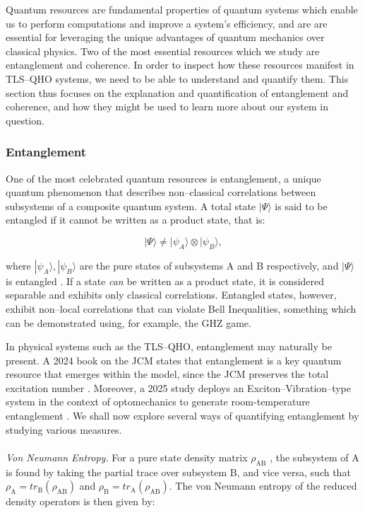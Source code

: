 \documentclass[12pt]{article}
\begin{document}
Quantum resources are fundamental properties of quantum systems which enable us to perform computations and improve a system's efficiency, and are are essential for leveraging the unique advantages of quantum mechanics over classical physics. Two of the most essential resources which we study are entanglement and coherence. In order to inspect how these resources manifest in TLS--QHO systems, we need to be able to understand and quantify them. This section thus focuses on the explanation and quantification of entanglement and coherence, and how they might be used to learn more about our system in question. 

\subsubsection{Entanglement}

One of the most celebrated quantum resources is entanglement, a unique quantum phenomenon that describes non--classical correlations between subsystems of a composite quantum system. A total state $|\Psi\rangle$ is said to be entangled if it cannot be written as a product state, that is:

\begin{equation}
    |\Psi\rangle \neq |\psi_A\rangle \otimes |\psi_B\rangle,
\end{equation}

where $|\psi_A\rangle, |\psi_B\rangle$ are the pure states of subsystems A and B respectively, and $|\Psi\rangle$ is entangled \cite{Entanglement1999-Overview_&REE}. If a state \textit{can} be written as a product state, it is considered separable and exhibits only classical correlations. Entangled states, however, exhibit non--local correlations that can violate Bell Inequalities, something which can be demonstrated using, for example, the GHZ game. 

In physical systems such as the TLS--QHO, entanglement may  naturally be present. A 2024 book on the JCM states that entanglement is a key quantum resource that emerges within the model, since the JCM preserves the total excitation number \cite{General2024-JC_overview}. Moreover, a 2025 study deploys an Exciton--Vibration--type system in the context of optomechanics to generate room-temperature entanglement \cite{Entanglement2025-ExVib_roomtemp}. We shall now explore several ways of quantifying entanglement by studying various measures. \\
\\
\textit{Von Neumann Entropy.} For a pure state density matrix $\rho_{\scriptscriptstyle \text{AB}}$ \cite{Entanglement1999-Overview_&REE}, the subsystem of A is  found by taking the partial trace over subsystem B, and vice versa, such that $\rho_{\scriptscriptstyle \text{A}} = tr_{\scriptscriptstyle \text{B}}(\rho_{\scriptscriptstyle \text{AB}})$ and $\rho_{\scriptscriptstyle \text{B}} = tr_{\scriptscriptstyle \text{A}}(\rho_{\scriptscriptstyle \text{AB}})$. The von Neumann entropy of the reduced density operators is then given by:
\end{document}
